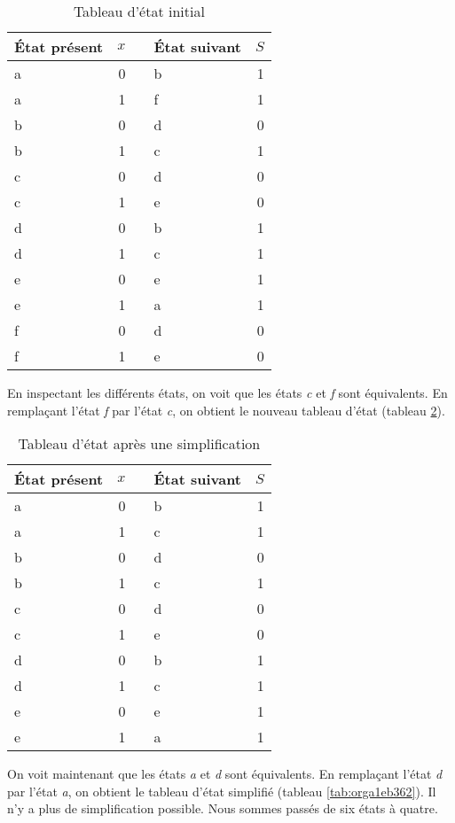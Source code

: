 \documentclass[letter, oneside]{book}
\begin{document}
\begin{table}[htbp]
\caption{\label{tab:org18fce56}Tableau d'état initial}
\centering
\begin{tabular}{lrllr}
État présent & \(x\) &  & État suivant & \(S\)\\[0pt]
\hline
a & 0 &  & b & 1\\[0pt]
a & 1 &  & f & 1\\[0pt]
b & 0 &  & d & 0\\[0pt]
b & 1 &  & c & 1\\[0pt]
c & 0 &  & d & 0\\[0pt]
c & 1 &  & e & 0\\[0pt]
d & 0 &  & b & 1\\[0pt]
d & 1 &  & c & 1\\[0pt]
e & 0 &  & e & 1\\[0pt]
e & 1 &  & a & 1\\[0pt]
f & 0 &  & d & 0\\[0pt]
f & 1 &  & e & 0\\[0pt]
\end{tabular}
\end{table}

En inspectant les différents états, on voit que les états \emph{c} et \emph{f}
sont équivalents. En remplaçant l'état \emph{f} par l'état \emph{c}, on obtient
le nouveau tableau d'état (tableau \ref{tab:org7c5d473}).

\begin{table}[htbp]
\caption{\label{tab:org7c5d473}Tableau d'état après une simplification}
\centering
\begin{tabular}{lrllr}
État présent & \(x\) &  & État suivant & \(S\)\\[0pt]
\hline
a & 0 &  & b & 1\\[0pt]
a & 1 &  & c & 1\\[0pt]
b & 0 &  & d & 0\\[0pt]
b & 1 &  & c & 1\\[0pt]
c & 0 &  & d & 0\\[0pt]
c & 1 &  & e & 0\\[0pt]
d & 0 &  & b & 1\\[0pt]
d & 1 &  & c & 1\\[0pt]
e & 0 &  & e & 1\\[0pt]
e & 1 &  & a & 1\\[0pt]
\end{tabular}
\end{table}

On voit maintenant que les états \emph{a} et \emph{d} sont équivalents. En
remplaçant l'état \emph{d} par l'état \emph{a}, on obtient le tableau d'état
simplifié (tableau \ref{tab:orga1eb362}). Il n'y a plus de simplification
possible. Nous sommes passés de six états à quatre.
\end{document}

